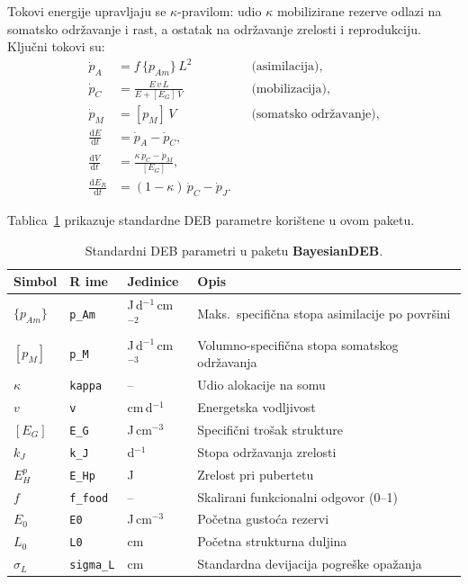 \documentclass[11pt,a4paper]{article}
\newcommand{\pkg}[1]{\textbf{#1}}
\newcommand{\code}[1]{\texttt{#1}}
\begin{document}
Tokovi energije upravljaju se $\kappa$-pravilom: udio $\kappa$
mobilizirane rezerve odlazi na somatsko održavanje i rast, a ostatak na
održavanje zrelosti i reprodukciju.  Ključni tokovi su:
\begin{align}
  \dot{p}_A &= f\,\{p_{Am}\}\,L^2  &&\text{(asimilacija)}, \label{eq:pA}\\
  \dot{p}_C &= \frac{E\,v\,L}{E + [E_G]\,V}  &&\text{(mobilizacija)}, \label{eq:pC}\\
  \dot{p}_M &= [p_M]\,V  &&\text{(somatsko održavanje)}, \label{eq:pM}\\
  \frac{\mathrm{d}E}{\mathrm{d}t} &= \dot{p}_A - \dot{p}_C,  \label{eq:dE}\\
  \frac{\mathrm{d}V}{\mathrm{d}t} &= \frac{\kappa\,\dot{p}_C - \dot{p}_M}{[E_G]},  \label{eq:dV}\\
  \frac{\mathrm{d}E_R}{\mathrm{d}t} &= (1-\kappa)\,\dot{p}_C - \dot{p}_J.  \label{eq:dR}
\end{align}

Tablica~\ref{tab:params} prikazuje standardne DEB parametre korištene u
ovom paketu.

\begin{table}[htbp]
\centering
\caption{Standardni DEB parametri u paketu \pkg{BayesianDEB}.}
\label{tab:params}
\begin{tabular}{llll}
\toprule
\textbf{Simbol} & \textbf{R ime} & \textbf{Jedinice} & \textbf{Opis} \\
\midrule
$\{p_{Am}\}$ & \code{p\_Am} & J\,d$^{-1}$\,cm$^{-2}$ & Maks.\ specifična stopa asimilacije po površini \\
$[p_M]$      & \code{p\_M}  & J\,d$^{-1}$\,cm$^{-3}$ & Volumno-specifična stopa somatskog održavanja \\
$\kappa$     & \code{kappa} & -- & Udio alokacije na somu \\
$v$          & \code{v}     & cm\,d$^{-1}$ & Energetska vodljivost \\
$[E_G]$      & \code{E\_G}  & J\,cm$^{-3}$ & Specifični trošak strukture \\
$k_J$        & \code{k\_J}  & d$^{-1}$ & Stopa održavanja zrelosti \\
$E_H^p$      & \code{E\_Hp} & J & Zrelost pri pubertetu \\
$f$          & \code{f\_food} & -- & Skalirani funkcionalni odgovor (0--1) \\
$E_0$        & \code{E0}    & J\,cm$^{-3}$ & Početna gustoća rezervi \\
$L_0$        & \code{L0}    & cm & Početna strukturna duljina \\
$\sigma_L$   & \code{sigma\_L} & cm & Standardna devijacija pogreške opažanja \\
\bottomrule
\end{tabular}
\end{table}
\end{document}
